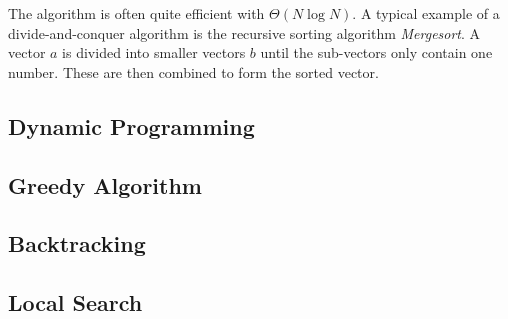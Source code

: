The algorithm is often quite efficient with $\Theta(N\log N)$. A typical example of a divide-and-conquer algorithm is the recursive sorting algorithm \emph{Mergesort}. A vector $a$ is divided into smaller vectors $b$ until the sub-vectors only contain one number. These are then combined to form the sorted vector.



\subsection{Dynamic Programming}



\subsection{Greedy Algorithm}



\subsection{Backtracking}



\subsection{Local Search}



%